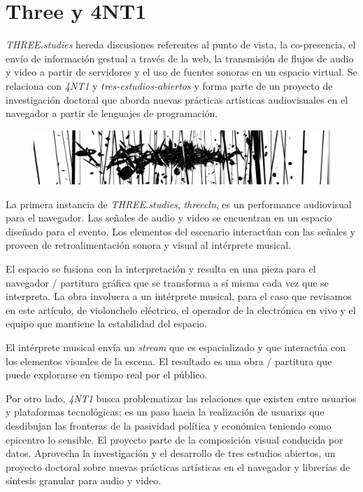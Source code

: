 
\section*{Three y 4NT1} %

\textit{THREE.studies} \citep{threestudies} hereda discusiones referentes al punto de vista, la co-presencia, el envío de información gestual a través de la web, la transmisión de flujos de audio y video a partir de servidores y el uso de fuentes sonoras en un espacio virtual. Se relaciona con \textit{4NT1} \citep{anti} y \textit{tres-estudios-abiertos} \citep{tresestudios} y forma parte de un proyecto de investigación doctoral que aborda nuevas prácticas artísticas audiovisuales en el navegador a partir de lenguajes de programación.  

\begin{figure}[H]
\includegraphics[width=\textwidth]{img/three.png}
\end{figure}

La primera instancia de \textit{THREE.studies}, \textit{threecln}, es un performance audiovisual para el navegador. Las señales de audio y video se encuentran en un espacio diseñado para el evento. Los elementos del escenario interactúan con las señales y proveen de retroalimentación sonora y visual al intérprete musical.

El espacio se fusiona con la interpretación y resulta en una pieza para el navegador / partitura gráfica que se transforma a sí misma cada vez que se interpreta. La obra involucra a un intérprete musical, para el caso que revisamos en este artículo, de violonchelo eléctrico, el operador de la electrónica en vivo y el equipo que mantiene la estabilidad del espacio.

El intérprete musical envía un \textit{stream} que es espacializado y que interactúa con los elementos visuales de la escena. El resultado es una obra / partitura que puede explorarse en tiempo real por el público. 

Por otro lado, \textit{4NT1} busca problematizar las relaciones que existen entre usuarios y plataformas tecnológicas; es un paso hacia la realización de usuarixs que desdibujan las fronteras de la pasividad política y económica teniendo como epicentro lo sensible. El proyecto parte de la composición visual conducida por datos. Aprovecha la investigación y el desarrollo de tres estudios abiertos, un proyecto doctoral sobre nuevas prácticas artísticas en el navegador y librerías de síntesis granular para audio y video.

